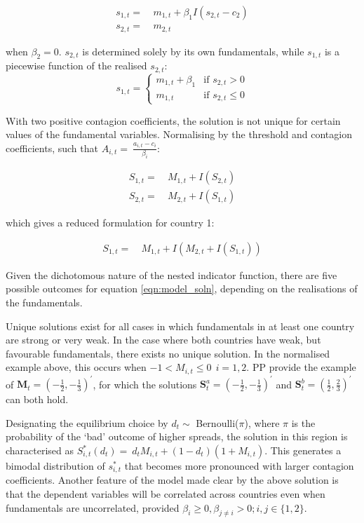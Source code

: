 \documentclass[../base.tex]{subfiles}
\begin{document}
\begin{align*}
	s_{1,t} =&~ m_{1,t} + \beta_1 I(s_{2,t} - c_2) \\
	s_{2,t} =&~ m_{2,t}
\end{align*}

when $\beta_2 = 0$. $s_{2,t}$ is determined solely by its own fundamentals, while $s_{1,t}$ is a piecewise function of the realised $s_{2,t}$:
\[
s_{1,t} = 
\begin{cases} 
m_{1,t} + \beta_1  & \text{if } s_{2,t} > 0 \\
m_{1,t}		       & \text{if } s_{2,t} \leq 0
\end{cases}
\]

With two positive contagion coefficients, the solution is not unique for certain values of the fundamental variables. Normalising by the threshold and contagion coefficients, such that $A_{i,t} =~\frac{a_{i,t} - c_i}{\beta_i}$:

\begin{align*}
	S_{1,t} =&~ M_{1,t} + I(S_{2,t})\\
	S_{2,t} =&~ M_{2,t} + I(S_{1,t})
\end{align*}

which gives a reduced formulation for country 1:

\begin{align}
	S_{1,t} =&~ M_{1,t} + I(M_{2,t} + I(S_{1,t}))
	\label{eqn:model_soln}
\end{align}

Given the dichotomous nature of the nested indicator function, there are five possible outcomes for equation \ref{eqn:model_soln}, depending on the realisations of the fundamentals. 

Unique solutions exist for all cases in which fundamentals in at least one country are strong or very weak. In the case where both countries have weak, but favourable fundamentals, there exists no unique solution. In the normalised example above, this occurs when $-1 < M_{i,t} \leq 0~~i = 1,2$. PP provide the example of $\mathbf{M}_t = (-\frac{1}{2}, -\frac{1}{3})^\prime$, for which the solutions $\mathbf{S}_t^a = (-\frac{1}{2}, -\frac{1}{3})^\prime$ and $\mathbf{S}_t^b = (\frac{1}{2}, \frac{2}{3})^\prime$ can both hold.

Designating the equilibrium choice by $d_t \sim$ Bernoulli($\pi$), where $\pi$ is the probability of the `bad' outcome of higher spreads, the solution in this region is characterised as $S_{i,t}^*(d_t) =~d_tM_{i,t} + (1 - d_t)(1 + M_{i,t})$. This generates a bimodal distribution of $s_{i,t}^*$ that becomes more pronounced with larger contagion coefficients. Another feature of the model made clear by the above solution is that the dependent variables will be correlated across countries even when fundamentals are uncorrelated, provided $\beta_i \geq 0, \beta_{j \neq i} > 0; i,j \in \{1, 2\}$. 
\end{document}
